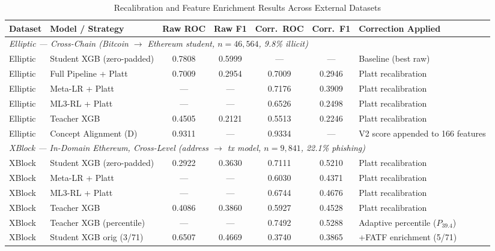 \documentclass[journal]{IEEEtran}
\begin{document}
\begin{table}[!t]
\centering
\caption{Recalibration and Feature Enrichment Results Across External Datasets}
\label{tab:recalibration}
\footnotesize
\begin{tabular}{llccccl}
\toprule
\textbf{Dataset} & \textbf{Model / Strategy} & \textbf{Raw ROC} & \textbf{Raw F1} & \textbf{Corr.\ ROC} & \textbf{Corr.\ F1} & \textbf{Correction Applied} \\
\midrule
\multicolumn{7}{l}{\textit{Elliptic --- Cross-Chain (Bitcoin $\to$ Ethereum student, $n = 46{,}564$, 9.8\% illicit)}} \\
Elliptic & Student XGB (zero-padded)   & 0.7808 & 0.5999 & ---    & ---    & Baseline (best raw) \\
Elliptic & Full Pipeline + Platt       & 0.7009 & 0.2954 & 0.7009 & 0.2946 & Platt recalibration \\
Elliptic & Meta-LR + Platt            & ---    & ---    & 0.7176 & 0.3909 & Platt recalibration \\
Elliptic & ML3-RL + Platt             & ---    & ---    & 0.6526 & 0.2498 & Platt recalibration \\
Elliptic & Teacher XGB                & 0.4505 & 0.2121 & 0.5513 & 0.2246 & Platt recalibration \\
Elliptic & Concept Alignment (D)       & 0.9311 & ---    & 0.9334 & ---    & V2 score appended to 166 features \\
\midrule
\multicolumn{7}{l}{\textit{XBlock --- In-Domain Ethereum, Cross-Level (address $\to$ tx model, $n = 9{,}841$, 22.1\% phishing)}} \\
XBlock & Student XGB (zero-padded)     & 0.2922 & 0.3630 & 0.7111 & 0.5210 & Platt recalibration \\
XBlock & Meta-LR + Platt              & ---    & ---    & 0.6030 & 0.4371 & Platt recalibration \\
XBlock & ML3-RL + Platt               & ---    & ---    & 0.6744 & 0.4676 & Platt recalibration \\
XBlock & Teacher XGB                  & 0.4086 & 0.3860 & 0.5927 & 0.4528 & Platt recalibration \\
XBlock & Teacher XGB (percentile)      & ---    & ---    & 0.7492 & 0.5288 & Adaptive percentile ($P_{39.4}$) \\
XBlock & Student XGB orig (3/71)       & 0.6507 & 0.4669 & 0.3740 & 0.3865 & +FATF enrichment (5/71) \\

\end{tabular}
\end{table}
\end{document}
